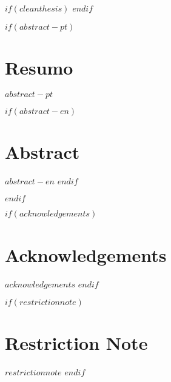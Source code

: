 
$if(cleanthesis)$
\clearpage
\customtitlebackpage
$endif$



$if(abstract-pt)$
\cleardoublepage
\begin{minipage}{\linewidth}

\chapter*{Resumo}
$abstract-pt$

$if(abstract-en)$
\chapter*{Abstract}
$abstract-en$
$endif$

\end{minipage}
\cleardoublepage
$endif$



$if(acknowledgements)$
\chapter*{Acknowledgements}
$acknowledgements$
$endif$



$if(restrictionnote)$
\chapter*{Restriction Note}
$restrictionnote$
$endif$



\cleardoublepage
